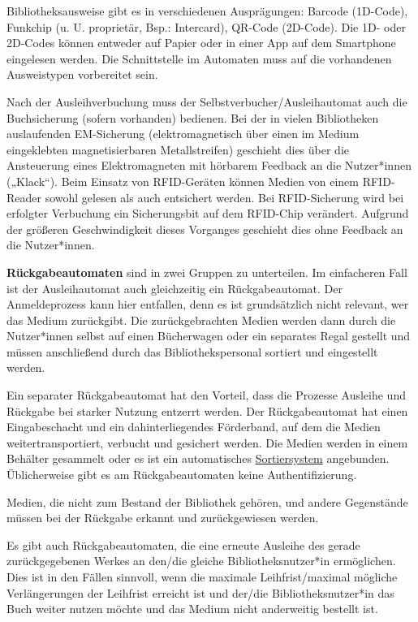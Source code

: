 \documentclass[
  11pt,
  letterpaper,
  DIV=11,
  twoside]{scrreprt}
\begin{document}
Bibliotheksausweise gibt es in verschiedenen Ausprägungen: Barcode
(1D-Code), Funkchip (u. U. proprietär, Bsp.: Intercard), QR-Code
(2D-Code). Die 1D- oder 2D-Codes können entweder auf Papier oder in
einer App auf dem Smartphone eingelesen werden. Die Schnittstelle im
Automaten muss auf die vorhandenen Ausweistypen vorbereitet sein.

Nach der Ausleihverbuchung muss der Selbstverbucher/Ausleihautomat auch
die Buchsicherung (sofern vorhanden) bedienen. Bei der in vielen
Bibliotheken auslaufenden EM-Sicherung (elektromagnetisch über einen im
Medium eingeklebten magnetisierbaren Metallstreifen) geschieht dies über
die Ansteuerung eines Elektromagneten mit hörbarem Feedback an die
Nutzer*innen („Klack``). Beim Einsatz von RFID-Geräten können Medien von
einem RFID-Reader sowohl gelesen als auch entsichert werden. Bei
RFID-Sicherung wird bei erfolgter Verbuchung ein Sicherungsbit auf dem
RFID-Chip verändert. Aufgrund der größeren Geschwindigkeit dieses
Vorganges geschieht dies ohne Feedback an die Nutzer*innen.

\textbf{Rückgabeautomaten} sind in zwei Gruppen zu unterteilen. Im
einfacheren Fall ist der Ausleihautomat auch gleichzeitig ein
Rückgabeautomat. Der Anmeldeprozess kann hier entfallen, denn es ist
grundsätzlich nicht relevant, wer das Medium zurückgibt. Die
zurückgebrachten Medien werden dann durch die Nutzer*innen selbst auf
einen Bücherwagen oder ein separates Regal gestellt und müssen
anschließend durch das Bibliothekspersonal sortiert und eingestellt
werden.

Ein separater Rückgabeautomat hat den Vorteil, dass die Prozesse
Ausleihe und Rückgabe bei starker Nutzung entzerrt werden. Der
Rückgabeautomat hat einen Eingabeschacht und ein dahinterliegendes
Förderband, auf dem die Medien weitertransportiert, verbucht und
gesichert werden. Die Medien werden in einem Behälter gesammelt oder es
ist ein automatisches \hyperref[sortiersysteme]{Sortiersystem}
angebunden. Üblicherweise gibt es am Rückgabeautomaten keine
Authentifizierung.

Medien, die nicht zum Bestand der Bibliothek gehören, und andere
Gegenstände müssen bei der Rückgabe erkannt und zurückgewiesen werden.

Es gibt auch Rückgabeautomaten, die eine erneute Ausleihe des gerade
zurückgegebenen Werkes an den/die gleiche Bibliotheksnutzer*in
ermöglichen. Dies ist in den Fällen sinnvoll, wenn die maximale
Leihfrist/maximal mögliche Verlängerungen der Leihfrist erreicht ist und
der/die Bibliotheksnutzer*in das Buch weiter nutzen möchte und das
Medium nicht anderweitig bestellt ist.
\end{document}
